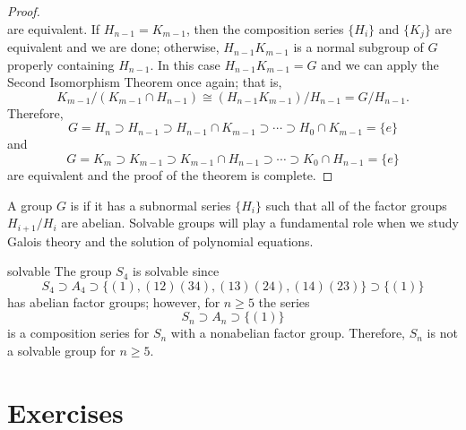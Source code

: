 \begin{proof}
\[\]
are equivalent. If $H_{n-1} = K_{m-1}$, then the composition series
$\{H_i \}$ and $\{ K_j \}$ are equivalent and we are done; otherwise,
$H_{n-1} K_{m-1}$  is a normal subgroup of $G$ properly containing
$H_{n-1}$.  In this case $H_{n-1} K_{m-1} = G$ and we can apply the
Second Isomorphism Theorem once again; that is,
\[
K_{m-1} / (K_{m-1} \cap H_{n-1}) \cong (H_{n-1} K_{m-1}) / H_{n-1} =
G/H_{n-1}.
\]
Therefore,
\[
G = H_n \supset H_{n-1} \supset H_{n-1} \cap K_{m-1} \supset 
\cdots \supset H_0 \cap K_{m-1} = \{ e \}
\]
and 
\[
G = K_m \supset K_{m-1} \supset K_{m-1} \cap H_{n-1} \supset 
\cdots \supset K_0 \cap H_{n-1} = \{ e \}
\]
are equivalent and the proof of the theorem is complete.
\end{proof}
 
 
\medskip
 
 
A group $G$ is  if it has 
a subnormal series $\{ H_i \}$ such that all of the factor groups 
$H_{i+1} / H_i$ are abelian. Solvable groups will play a fundamental 
role when we study Galois theory and the solution of polynomial 
equations. 
 
 
 
\begin{example}{solvable}
The group $S_4$ is solvable since
\[
S_4 \supset A_4 \supset \{ (1), (12)(34), (13)(24), (14)(23) \} 
\supset \{ (1) \}
\]
has abelian factor groups; however, for $n \geq 5$ the series
\[
S_n \supset A_n \supset \{ (1) \}
\]
is a composition series for $S_n$ with a nonabelian factor group.
Therefore, $S_n$ is not a solvable group for $n \geq 5$. 
\end{example}
 
 
 
 
\section*{Exercises}
\exrule
 
 
 
